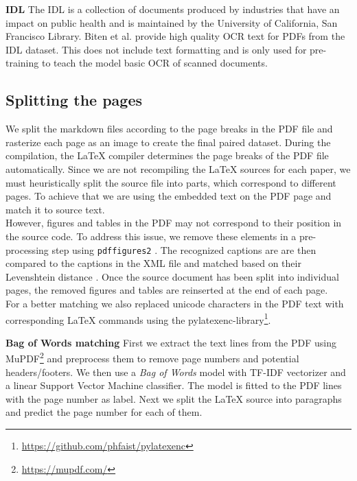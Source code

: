 \documentclass[]{article}
\newcommand{\footurl}[1]{\footnote{\url{#1}}}
\newcommand{\para}[1]{\textbf{#1} \quad}
\begin{document}
\para{IDL}  The IDL is a collection of documents produced by industries that have an impact on public health and is maintained by the University of California, San Francisco Library. %
Biten et al. \cite{biten_ocr-idl_2022} provide high quality OCR text for PDFs from the IDL dataset. This does not include text formatting and is only used for pre-training to teach the model basic OCR of scanned documents.\\

\subsection{Splitting the pages}
We split the markdown files according to the page breaks in the PDF file and rasterize each page as an image to create the final paired dataset. 
During the compilation, the LaTeX compiler determines the page breaks of the PDF file automatically. Since we are not recompiling the LaTeX sources for each paper, we must heuristically split the source file into parts, which correspond to different pages. To achieve that we are using the embedded text on the PDF page and match it to source text.\\
However, figures and tables in the PDF may not correspond to their position in the source code. 
To address this issue, we remove these elements in a pre-processing step using \verb|pdffigures2| \cite{clark_pdffigures_2016}. The recognized captions are are then compared to the captions in the XML file and matched based on their Levenshtein distance \cite{levenshtein_binary_1965}. Once the source document has been split into individual pages, the removed figures and tables are reinserted at the end of each page. \\
For a better matching we also replaced unicode characters in the PDF text with corresponding LaTeX commands using the pylatexenc-library\footurl{https://github.com/phfaist/pylatexenc}.

\para{Bag of Words matching}
First we extract the text lines from the PDF using MuPDF\footurl{https://mupdf.com/} and preprocess them to remove page numbers and potential headers/footers. We then use a \emph{Bag of Words} model \cite{harris_distributional_1954} with TF-IDF vectorizer and a linear Support Vector Machine classifier. The model is fitted to the PDF lines with the page number as label. %
Next we split the LaTeX source into paragraphs and predict the page number for each of them.
\end{document}
